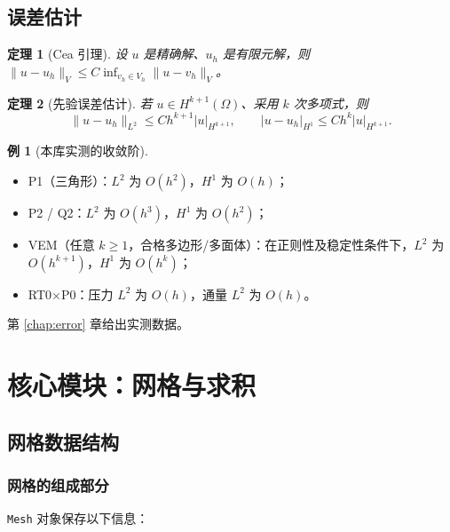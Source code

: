\documentclass[UTF8,11pt,oneside]{ctexbook}
\theoremstyle{definition}
\newtheorem{example}{例}[chapter]
\theoremstyle{plain}
\newtheorem{theorem}{定理}[chapter]
\newcommand{\code}[1]{\texttt{#1}}
\begin{document}
\section{误差估计}

\begin{theorem}[Cea 引理]
设 $u$ 是精确解、$u_h$ 是有限元解，则
$\|u-u_h\|_V\le C\inf_{v_h\in V_h}\|u-v_h\|_V$。
\end{theorem}

\begin{theorem}[先验误差估计]
若 $u\in H^{k+1}(\Omega)$、采用 $k$ 次多项式，则
\begin{equation}
\|u-u_h\|_{L^2}\le C h^{k+1}|u|_{H^{k+1}},\qquad
|u-u_h|_{H^1}\le C h^{k}|u|_{H^{k+1}} .
\label{eq:apriori}
\end{equation}
\end{theorem}

\begin{example}[本库实测的收敛阶]
\begin{itemize}[itemsep=0.15em]
  \item P1（三角形）：$L^2$ 为 $O(h^2)$，$H^1$ 为 $O(h)$；
  \item P2 / Q2：$L^2$ 为 $O(h^3)$，$H^1$ 为 $O(h^2)$；
  \item VEM（任意 $k\ge1$，合格多边形/多面体）：在正则性及稳定性条件下，$L^2$ 为 $O(h^{k+1})$，$H^1$ 为 $O(h^k)$；
  \item RT0$\times$P0：压力 $L^2$ 为 $O(h)$，通量 $L^2$ 为 $O(h)$。
\end{itemize}
第 \ref{chap:error} 章给出实测数据。
\end{example}

\chapter{核心模块：网格与求积}
\label{chap:core}

\section{网格数据结构}

\subsection{网格的组成部分}

\code{Mesh} 对象保存以下信息：
\end{document}

